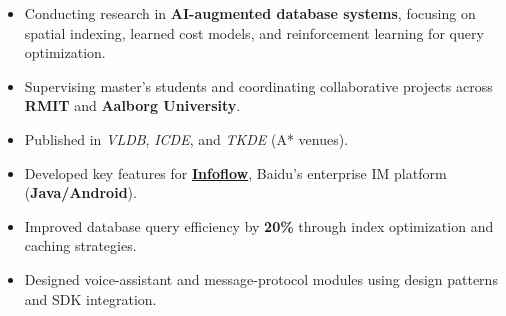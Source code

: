 \documentclass{resume}
\begin{document}
\begin{itemize}
  \item Conducting research in \textbf{AI-augmented database systems}, focusing on spatial indexing, learned cost models, and reinforcement learning for query optimization.
  \item Supervising master’s students and coordinating collaborative projects across \textbf{RMIT} and \textbf{Aalborg University}.
  \item Published in \textit{VLDB}, \textit{ICDE}, and \textit{TKDE} (A* venues).
\end{itemize}

\begin{itemize}
  \item Developed key features for \href{https://infoflow.baidu.com/}{\textbf{Infoflow}}, Baidu’s enterprise IM platform (\textbf{Java/Android}).
  \item Improved database query efficiency by \textbf{20\%} through index optimization and caching strategies.
  \item Designed voice-assistant and message-protocol modules using design patterns and SDK integration.
\end{itemize}


\end{document}
